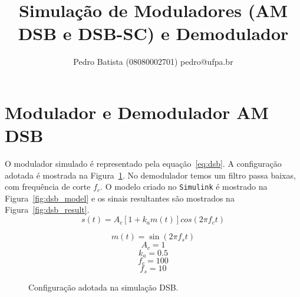 \documentclass{article}
\title{Simulação de Moduladores (AM DSB e DSB-SC) e Demodulador}
\author{Pedro Batista (08080002701) pedro@ufpa.br}
\begin{document}
\maketitle

\section{Modulador e Demodulador AM DSB}
O modulador simulado é representado pela equação~\ref{eq:dsb}. A configuração
adotada é mostrada na Figura~\ref{fig:dsb_conf}. No demodulador temos um filtro
passa baixas, com frequência de corte $f_c$. O modelo criado no \texttt{Simulink}
é mostrado na Figura~\ref{fig:dsb_model} e os sinais resultantes são mostrados na
Figura~\ref{fig:dsb_result}.
\begin{equation}\label{eq:dsb}
s(t)=A_c[1+k_am(t)]cos(2\pi f_ct)
\end{equation}
\begin{figure}[h]
\begin{equation}
m(t)=\sin(2\pi f_st)
\end{equation}
\begin{equation}
A_c=1
\end{equation}
\begin{equation}
k_a=0.5
\end{equation}
\begin{equation}
f_c=100
\end{equation}
\begin{equation}
f_s=10
\end{equation}
\caption{Configuração adotada na simulação DSB.}
\label{fig:dsb_conf}
\end{figure}
\end{document}

